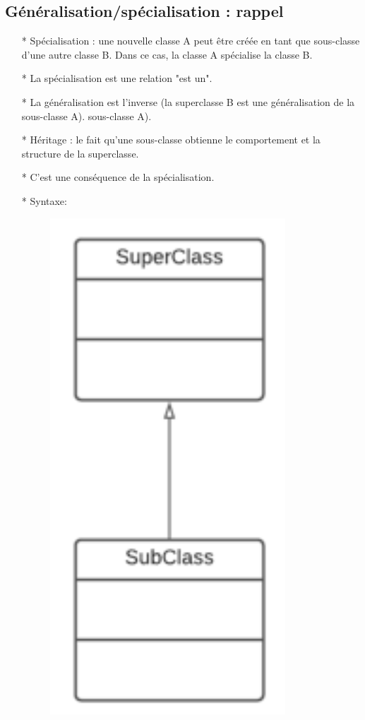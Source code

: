 \documentclass[12pt]{article}
\begin{document}
\subsection{Généralisation/spécialisation : rappel}
\begin{itemize}
	\item[* ]  Spécialisation : une nouvelle classe A peut être créée en tant que sous-classe d'une autre classe B. Dans ce cas, la classe A spécialise la classe B.
	\item [* ] La spécialisation est une relation "est un".
	\item[* ] La généralisation est l'inverse (la superclasse B est une généralisation de la sous-classe A).
	sous-classe A).
	\item[* ] Héritage : le fait qu'une sous-classe obtienne le comportement et la
	structure de la superclasse.
	\item[* ]  C'est une conséquence de la spécialisation.
	\item[* ] Syntaxe:
		\begin{figure}[!hbtp]
		\centering
		\includegraphics[scale=0.75]{Capture22.PNG}
	\end{figure}
\end{itemize}
\end{document}

